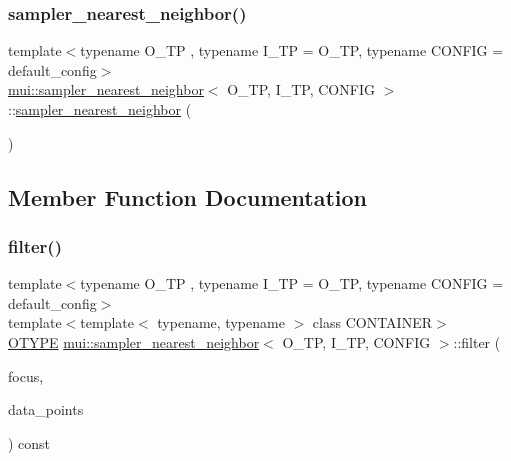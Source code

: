 \subsubsection{\texorpdfstring{sampler\+\_\+nearest\+\_\+neighbor()}{sampler\_nearest\_neighbor()}}
{\footnotesize\ttfamily template$<$typename O\+\_\+\+TP , typename I\+\_\+\+TP  = O\+\_\+\+TP, typename C\+O\+N\+F\+IG  = default\+\_\+config$>$ \\
\hyperlink{classmui_1_1sampler__nearest__neighbor}{mui\+::sampler\+\_\+nearest\+\_\+neighbor}$<$ O\+\_\+\+TP, I\+\_\+\+TP, C\+O\+N\+F\+IG $>$\+::\hyperlink{classmui_1_1sampler__nearest__neighbor}{sampler\+\_\+nearest\+\_\+neighbor} (\begin{DoxyParamCaption}{ }\end{DoxyParamCaption})\hspace{0.3cm}{\ttfamily [inline]}}



\subsection{Member Function Documentation}
\mbox{\label{classmui_1_1sampler__nearest__neighbor_aab0a19a5437eecb12d6d3baa7813e2aa}} 
\subsubsection{\texorpdfstring{filter()}{filter()}}
{\footnotesize\ttfamily template$<$typename O\+\_\+\+TP , typename I\+\_\+\+TP  = O\+\_\+\+TP, typename C\+O\+N\+F\+IG  = default\+\_\+config$>$ \\
template$<$template$<$ typename, typename $>$ class C\+O\+N\+T\+A\+I\+N\+ER$>$ \\
\hyperlink{classmui_1_1sampler__nearest__neighbor_a20f17bd1227ef27fd3e7658b773547ff}{O\+T\+Y\+PE} \hyperlink{classmui_1_1sampler__nearest__neighbor}{mui\+::sampler\+\_\+nearest\+\_\+neighbor}$<$ O\+\_\+\+TP, I\+\_\+\+TP, C\+O\+N\+F\+IG $>$\+::filter (\begin{DoxyParamCaption}\item[{\hyperlink{classmui_1_1sampler__nearest__neighbor_ace9bf5dd74eb5ff63c05941c5cf2a825}{point\+\_\+type}}]{focus,  }\item[{const C\+O\+N\+T\+A\+I\+N\+ER$<$ \hyperlink{classmui_1_1sampler__nearest__neighbor_aa36c4aae91219490c854650da1b1e674}{I\+T\+Y\+PE}, C\+O\+N\+F\+IG $>$ \&}]{data\+\_\+points }\end{DoxyParamCaption}) const\hspace{0.3cm}{\ttfamily [inline]}}

